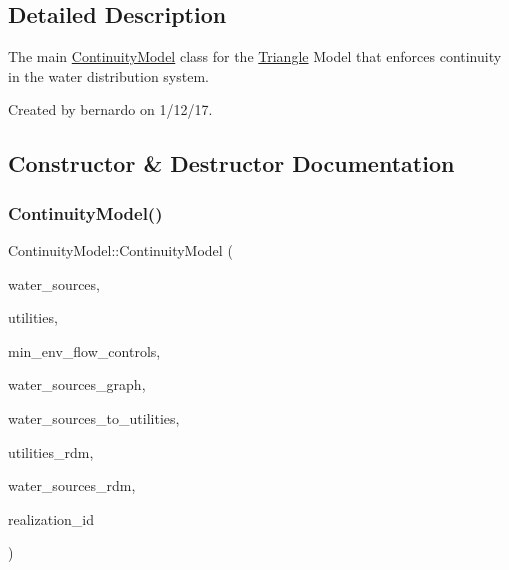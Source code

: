 \subsection{Detailed Description}
The main {\ttfamily \mbox{\hyperlink{classContinuityModel}{Continuity\+Model}}} class for the \mbox{\hyperlink{classTriangle}{Triangle}} Model that enforces continuity in the water distribution system. 

Created by bernardo on 1/12/17. 

\subsection{Constructor \& Destructor Documentation}
\mbox{\label{classContinuityModel_acadf595deb924bc08c9b702adf223365}} 
\subsubsection{\texorpdfstring{Continuity\+Model()}{ContinuityModel()}\hspace{0.1cm}{\footnotesize\ttfamily [1/2]}}
{\footnotesize\ttfamily Continuity\+Model\+::\+Continuity\+Model (\begin{DoxyParamCaption}\item[{vector$<$ \mbox{\hyperlink{classWaterSource}{Water\+Source}} $\ast$$>$ \&}]{water\+\_\+sources,  }\item[{vector$<$ \mbox{\hyperlink{classUtility}{Utility}} $\ast$$>$ \&}]{utilities,  }\item[{vector$<$ \mbox{\hyperlink{classMinEnvFlowControl}{Min\+Env\+Flow\+Control}} $\ast$$>$ \&}]{min\+\_\+env\+\_\+flow\+\_\+controls,  }\item[{const \mbox{\hyperlink{classGraph}{Graph}} \&}]{water\+\_\+sources\+\_\+graph,  }\item[{const vector$<$ vector$<$ int $>$$>$ \&}]{water\+\_\+sources\+\_\+to\+\_\+utilities,  }\item[{vector$<$ double $>$ \&}]{utilities\+\_\+rdm,  }\item[{vector$<$ double $>$ \&}]{water\+\_\+sources\+\_\+rdm,  }\item[{unsigned long}]{realization\+\_\+id }\end{DoxyParamCaption})}



